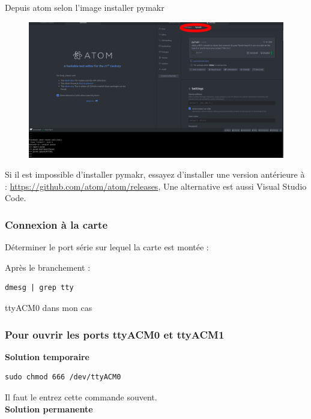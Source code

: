 \documentclass{article}
\begin{document}
Depuis atom selon l'image installer pymakr


    \begin{figure}[H]
\begin{center}
\advance\leftskip-3cm
\advance\rightskip-3cm
\includegraphics[keepaspectratio=true,scale=0.2]{atom.png}
\label{visina8}
\end{center}\end{figure}

Si il est impossible d'installer pymakr, essayez d'installer une version antérieure à : \url{https://github.com/atom/atom/releases},
Une alternative est aussi Visual Studio Code.


\subsubsection{Connexion à la carte}

Déterminer le port série sur lequel la carte est montée :

Après le branchement : 

\begin{verbatim}
dmesg | grep tty 
\end{verbatim}

ttyACM0 dans mon cas




\subsubsection{Pour ouvrir les ports ttyACM0 et ttyACM1 }

\textbf{Solution temporaire} 


\begin{verbatim}
sudo chmod 666 /dev/ttyACM0
\end{verbatim}
Il faut le entrez cette commande souvent. \\
\textbf{Solution permanente}\\
\end{document}
